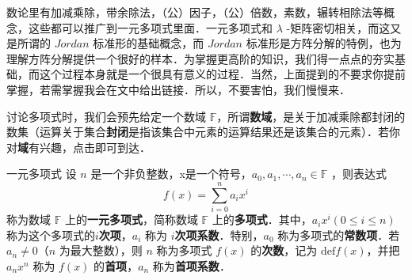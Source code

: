 
数论里有加减乘除，带余除法，（公）因子，（公）倍数，素数，辗转相除法等概念，这些都可以推广到一元多项式里面．一元多项式和 $\lambda$ -矩阵密切相关，而这又是所谓的 $Jordan$ 标准形的基础概念，而 $Jordan$ 标准形是方阵分解的特例，也为理解方阵分解提供一个很好的样本．为掌握更高阶的知识，我们得一点点的夯实基础，而这个过程本身就是一个很具有意义的过程．当然，上面提到的不要求你提前掌握，若需掌握我会在文中给出链接．所以，不要害怕，我们慢慢来．

讨论多项式时，我们会预先给定一个数域 $\mathbb{F}$，所谓\textbf{数域}，是关于加减乘除都封闭的数集（运算关于集合\textbf{封闭}是指该集合中元素的运算结果还是该集合的元素）．若你对\textbf{域}有兴趣，点击即可到达．
\begin{definition}{一元多项式}
设 $n$ 是一个非负整数，x是一个符号，$a_0,a_1,\cdots,a_n\in \mathbb{F}$ ，则表达式
\begin{equation}
f(x)=\sum_{i=0}^{n}a_i x^i
\end{equation}
称为数域 $\mathbb{F}$ 上的\textbf{一元多项式}，简称数域 $\mathbb{F}$ 上的\textbf{多项式}．其中，$a_ix^i(0\leq i\leq n)$ 称为这个多项式的\textbf{$i$次项}，$a_i$ 称为 \textbf{$i$次项系数}．特别，$a_0$ 称为多项式的\textbf{常数项}．若 $a_n\neq 0$（$n$ 为最大整数），则 $n$ 称为多项式 $f(x)$ 的\textbf{次数}，记为 $\mathrm{def}f(x)$，并把 $a_nx^n$ 称为 $f(x)$ 的\textbf{首项}，$a_n$ 称为\textbf{首项系数}．
\end{definition}
